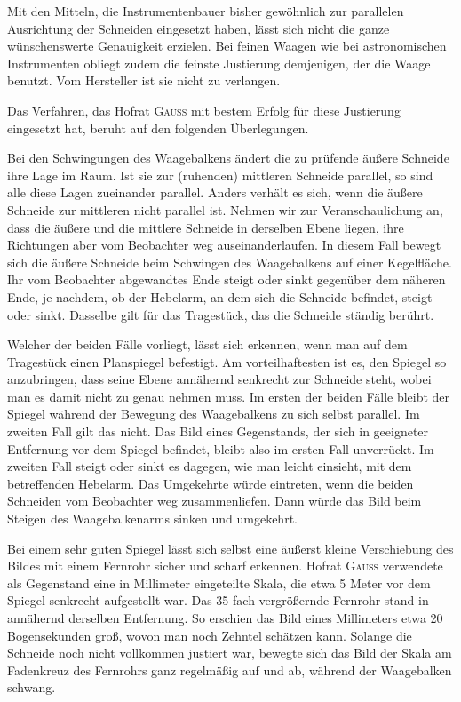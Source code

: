 Mit den Mitteln, die Instrumentenbauer bisher gewöhnlich zur parallelen Ausrichtung der Schneiden eingesetzt haben, lässt sich nicht die ganze wünschenswerte Genauigkeit erzielen. Bei feinen Waagen wie bei astronomischen Instrumenten obliegt zudem die feinste Justierung demjenigen, der die Waage benutzt. Vom Hersteller ist sie nicht zu verlangen.

Das Verfahren, das Hofrat \textsc{Gauss} mit bestem Erfolg für diese Justierung eingesetzt hat, beruht auf den folgenden Überlegungen.

Bei den Schwingungen des Waagebalkens ändert die zu prüfende äußere Schneide ihre Lage im Raum. Ist sie zur (ruhenden) mittleren Schneide parallel, so sind alle diese Lagen zueinander parallel. Anders verhält es sich, wenn die äußere Schneide zur mittleren nicht parallel ist. Nehmen wir zur Veranschaulichung an, dass die äußere und die mittlere Schneide in derselben Ebene liegen, ihre Richtungen aber vom Beobachter weg auseinanderlaufen. In diesem Fall bewegt sich die äußere Schneide beim Schwingen des Waagebalkens auf einer Kegelfläche. Ihr vom Beobachter abgewandtes Ende steigt oder sinkt gegenüber dem näheren Ende, je nachdem, ob der Hebelarm, an dem sich die Schneide befindet, steigt oder sinkt. Dasselbe gilt für das Tragestück, das die Schneide ständig berührt.

Welcher der beiden Fälle vorliegt, lässt sich erkennen, wenn man auf dem Tragestück einen Planspiegel befestigt. Am vorteilhaftesten ist es, den Spiegel so anzubringen, dass seine Ebene annähernd senkrecht zur Schneide steht, wobei man es damit nicht zu genau nehmen muss. Im ersten der beiden Fälle bleibt der Spiegel während der Bewegung des Waagebalkens zu sich selbst parallel. Im zweiten Fall gilt das nicht. Das Bild eines Gegenstands, der sich in geeigneter Entfernung vor dem Spiegel befindet, bleibt also im ersten Fall unverrückt. Im zweiten Fall steigt oder sinkt es dagegen, wie man leicht einsieht, mit dem betreffenden Hebelarm. Das Umgekehrte würde eintreten, wenn die beiden Schneiden vom Beobachter weg zusammenliefen. Dann würde das Bild beim Steigen des Waagebalkenarms sinken und umgekehrt.

Bei einem sehr guten Spiegel lässt sich selbst eine
äußerst kleine Verschiebung des Bildes mit einem Fernrohr sicher und scharf erkennen. Hofrat \textsc{Gauss} verwendete als Gegenstand eine in Millimeter eingeteilte Skala, die etwa 5 Meter vor dem Spiegel senkrecht aufgestellt war. Das 35-fach vergrößernde Fernrohr stand in annähernd derselben Entfernung. So erschien das Bild eines Millimeters etwa 20 Bogensekunden groß, wovon man noch Zehntel schätzen kann. Solange die Schneide noch nicht vollkommen justiert war, bewegte sich das Bild der Skala am Fadenkreuz des Fernrohrs ganz regelmäßig auf und ab, während der Waagebalken schwang.

